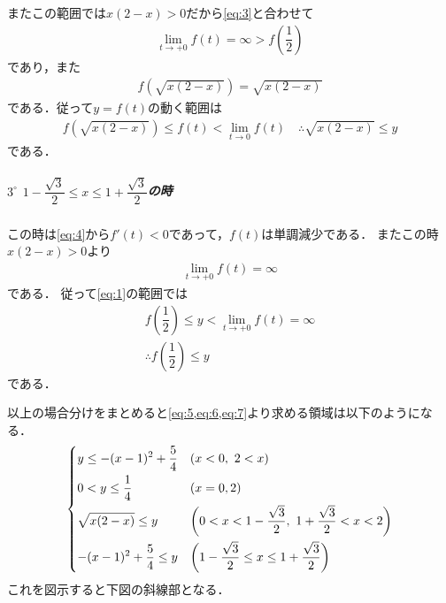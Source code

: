 \documentclass[../../main.tex]{subfiles}
\begin{document}
またこの範囲では$x(2-x)>0$だから\cref{eq:3}と合わせて
\begin{align}
  \lim_{t\to +0}f(t) =\infty > f\left(\dfrac{1}{2}\right)
\end{align}
であり，また
\begin{align}
  f(\sqrt{x(2-x)})=\sqrt{x(2-x)}
\end{align}
である．従って$y=f(t)$の動く範囲は
\begin{align}
  f(\sqrt{x(2-x)})\le f(t)<\lim_{t\to0}f(t)
  \quad\therefore
  \sqrt{x(2-x)} \le y \label{eq:6}
\end{align}
である．

\subparagraph{$3^\circ$ $1-\dfrac{\sqrt{3}}{2}\le x\le1+\dfrac{\sqrt{3}}{2}$の時}

この時は\cref{eq:4}から$f'(t)<0$であって，$f(t)$は単調減少である．
またこの時$x(2-x)>0$より
\begin{align}
  \lim_{t\to +0} f(t) = \infty
\end{align}
である．
従って\cref{eq:1}の範囲では
\begin{align}
  f\left(\dfrac{1}{2}\right)\le y <\lim_{t\to +0}f(t)=\infty \\
  \therefore
  f\left(\dfrac{1}{2}\right)\le y \label{eq:7}
\end{align}
である．
\casesend

以上の場合分けをまとめると\cref{eq:5,eq:6,eq:7}より求める領域は以下のようになる．
\begin{align}
  \begin{dcases}
    y\le -(x-1)^2+\dfrac{5}{4}  & \left( x< 0,\ 2< x\right)  \\
    0 < y \le \dfrac{1}{4}      & \left( x=0,2 \right)  \\
    \sqrt{x(2-x)} \le y         & \left( 0<x<1-\dfrac{\sqrt{3}}{2},\ 1+\dfrac{\sqrt{3}}{2}<x<2\right) \\
    -(x-1)^2+\dfrac{5}{4} \le y & \left( 1-\dfrac{\sqrt{3}}{2}\le x\le1+\dfrac{\sqrt{3}}{2}\right)
  \end{dcases}
\end{align}
これを図示すると下図の斜線部となる．
\end{document}
